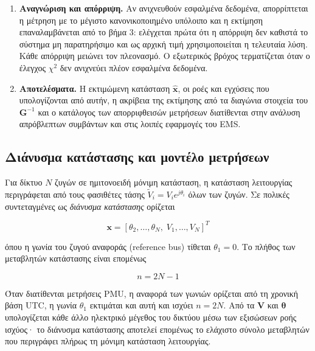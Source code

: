 \begin{enumerate}
\item \textbf{Αναγνώριση και απόρριψη.} Αν ανιχνευθούν εσφαλμένα δεδομένα, απορρίπτεται η
      μέτρηση με το μέγιστο κανονικοποιημένο υπόλοιπο και η εκτίμηση επαναλαμβάνεται από το
      βήμα 3: ελέγχεται πρώτα ότι η απόρριψη δεν καθιστά το σύστημα μη παρατηρήσιμο και ως
      αρχική τιμή χρησιμοποιείται η τελευταία λύση. Κάθε απόρριψη μειώνει τον πλεονασμό. Ο εξωτερικός
      βρόχος τερματίζεται όταν ο έλεγχος $\chi^2$ δεν ανιχνεύει πλέον εσφαλμένα δεδομένα.
\item \textbf{Αποτελέσματα.} Η εκτιμώμενη κατάσταση $\hat{\mathbf{x}}$, οι ροές και εγχύσεις
      που υπολογίζονται από αυτήν, η ακρίβεια της εκτίμησης από τα διαγώνια στοιχεία του
      $\mathbf{G}^{-1}$ και ο κατάλογος των απορριφθεισών μετρήσεων διατίθενται στην ανάλυση
      απρόβλεπτων συμβάντων και στις λοιπές εφαρμογές του EMS.
\end{enumerate}

\subsection{Διάνυσμα κατάστασης και μοντέλο μετρήσεων}

Για δίκτυο $N$ ζυγών σε ημιτονοειδή μόνιμη κατάσταση, η κατάσταση λειτουργίας περιγράφεται από
τους φασιθέτες τάσης $\tilde{V}_i = V_i e^{j\theta_i}$ όλων των ζυγών. Σε πολικές συντεταγμένες
ως \emph{διάνυσμα κατάστασης} ορίζεται

\begin{equation}
\mathbf{x} = \left[\theta_2, \ldots, \theta_N,\; V_1, \ldots, V_N\right]^{T}
\label{eq:statevec}
\end{equation}

όπου η γωνία του ζυγού αναφοράς (reference bus) τίθεται $\theta_1 = 0$. Το πλήθος των
μεταβλητών κατάστασης είναι επομένως

\begin{equation}
n = 2N - 1
\label{eq:nstates}
\end{equation}

Όταν διατίθενται μετρήσεις PMU, η αναφορά των γωνιών ορίζεται από τη χρονική βάση UTC, η
γωνία $\theta_1$ εκτιμάται και αυτή και ισχύει $n = 2N$. Από τα $\mathbf{V}$ και
$\boldsymbol{\theta}$ υπολογίζεται κάθε άλλο ηλεκτρικό μέγεθος του δικτύου μέσω των εξισώσεων
ροής ισχύος· το διάνυσμα κατάστασης αποτελεί επομένως το ελάχιστο σύνολο μεταβλητών που
περιγράφει πλήρως τη μόνιμη κατάσταση λειτουργίας.

